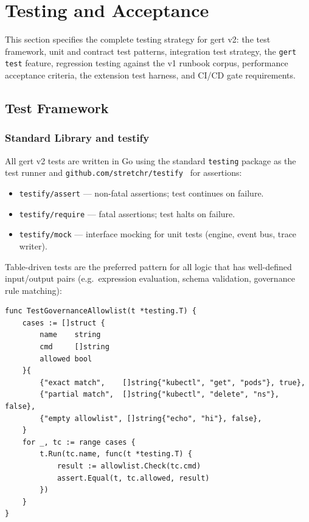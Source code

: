 \chapter{Testing and Acceptance}
\label{ch:testing}

This section specifies the complete testing strategy for gert v2: the test framework, unit and contract test patterns, integration test strategy, the \texttt{gert test} feature, regression testing against the v1 runbook corpus, performance acceptance criteria, the extension test harness, and CI/CD gate requirements.

\section{Test Framework}

\subsection{Standard Library and testify}

All gert v2 tests are written in Go using the standard \texttt{testing} package as the test runner and \texttt{github.com/stretchr/testify}~\cite{testify-library} for assertions:

\begin{itemize}
  \item \texttt{testify/assert} — non-fatal assertions; test continues on failure.
  \item \texttt{testify/require} — fatal assertions; test halts on failure.
  \item \texttt{testify/mock} — interface mocking for unit tests (engine, event bus, trace writer).
\end{itemize}

Table-driven tests are the preferred pattern for all logic that has well-defined input/output pairs (e.g.\ expression evaluation, schema validation, governance rule matching):

\begin{verbatim}
func TestGovernanceAllowlist(t *testing.T) {
    cases := []struct {
        name    string
        cmd     []string
        allowed bool
    }{
        {"exact match",    []string{"kubectl", "get", "pods"}, true},
        {"partial match",  []string{"kubectl", "delete", "ns"}, false},
        {"empty allowlist", []string{"echo", "hi"}, false},
    }
    for _, tc := range cases {
        t.Run(tc.name, func(t *testing.T) {
            result := allowlist.Check(tc.cmd)
            assert.Equal(t, tc.allowed, result)
        })
    }
}
\end{verbatim}

